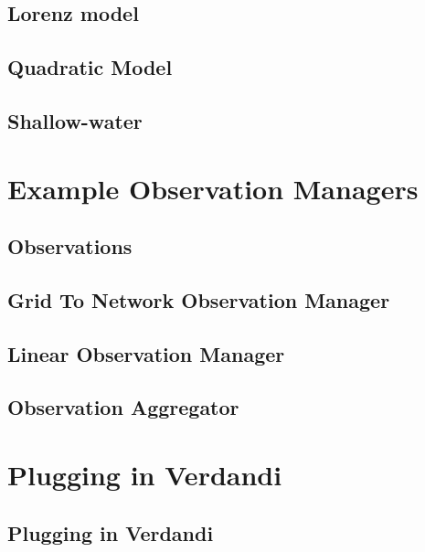 \documentclass{book}
\begin{document}
\chapter{Lorenz model}
\label{lorenz_model}
\hypertarget{lorenz_model}{}

\chapter{Quadratic Model}
\label{quadratic_model}
\hypertarget{quadratic_model}{}

\chapter{Shallow-\/water}
\label{shallow_water_model}
\hypertarget{shallow_water_model}{}

\part{Example Observation Managers}
\chapter{Observations}
\label{observations}
\hypertarget{observations}{}

\chapter{Grid To Network Observation Manager}
\label{grid_to_network_observation_manager}
\hypertarget{grid_to_network_observation_manager}{}

\chapter{Linear Observation Manager}
\label{linear_observation_manager}
\hypertarget{linear_observation_manager}{}

\chapter{Observation Aggregator}
\label{observation_aggregator}
\hypertarget{observation_aggregator}{}

\part{Plugging in Verdandi}
\chapter{Plugging in Verdandi}
\label{plugging_in_verdandi}
\hypertarget{plugging_in_verdandi}{}

\end{document}
